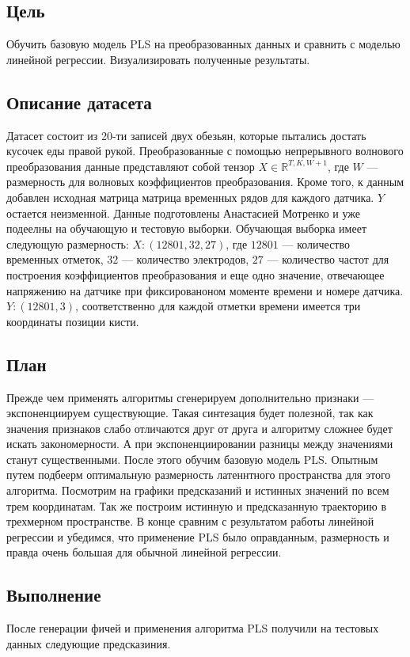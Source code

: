 \documentclass{article}
\begin{document}
\subsection{Цель}
Обучить базовую модель PLS на преобразованных данных и сравнить с моделью линейной регрессии. Визуализировать полученные результаты.
\subsection{Описание датасета}
Датасет состоит из 20-ти записей двух обезьян, которые пытались достать кусочек еды правой рукой. Преобразованные с помощью непрерывного волнового преобразования данные представляют собой тензор $X \in \mathds{R}^{T, K, W+1}$, где $W$ --- размерность для волновых коэффициентов преобразования. Кроме того, к данным добавлен исходная матрица матрица временных рядов для каждого датчика. $Y$ остается неизменной. Данные подготовлены Анастасией Мотренко и уже подеелны на обучающую и тестовую выборки. Обучающая выборка имеет следующую размерность: $X:(12801, 32, 27)$, где $12801$ --- количество временных отметок, $32$ --- количество электродов, $27$ --- количество частот для построения коэффициентов преобразования и еще одно значение, отвечающее напряжению на датчике при фиксированоном моменте времени и номере датчика. $Y:(12801, 3)$, соответственно для каждой отметки времени имеется три координаты позиции кисти. \par
\subsection{План}
Прежде чем применять алгоритмы сгенерируем дополнительно признаки --- экспоненциируем существующие. Такая синтезация будет полезной, так как значения признаков слабо отличаются друг от друга и алгоритму сложнее будет искать закономерности. А при экспоненциировании разницы между значениями станут существенными. После этого обучим базовую модель PLS. Опытным путем подбеерм оптимальную размерность латеннтного пространства для этого алгоритма. Посмотрим на графики предсказаний и истинных значений по всем трем координатам. Так же построим истинную и предсказанную траекторию в трехмерном пространстве.  В конце сравним с результатом работы линейной регрессии и убедимся, что применение PLS было оправданным, размерность и правда очень большая для обычной линейной регрессии.
\subsection{Выполнение}
После генерации фичей и применения алгоритма PLS получили на тестовых данных следующие предсказиния.
\end{document}
